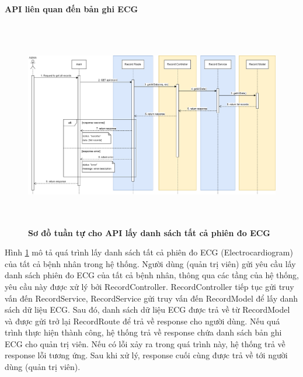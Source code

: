 
\paragraph{API liên quan đến bản ghi ECG}
\mbox{}

\begin{figure}[H]
  \centering
  \includegraphics[width=16cm,height=9cm]{Images/sequence_api/getAllRecord.png}
  \caption[Sơ đồ tuần tự cho API lấy danh sách tất cả phiên đo ECG ]{\bfseries \fontsize{12pt}{0pt}
  \selectfont Sơ đồ tuần tự cho API lấy danh sách tất cả phiên đo ECG }
  \label{getAllEcgRecords} %
\end{figure}
Hình \ref{getAllEcgRecords} mô tả quá trình lấy danh sách tất cả phiên đo ECG (Electrocardiogram) của tất cả bệnh nhân trong hệ thống. Người dùng (quản trị viên) gửi yêu cầu lấy danh sách phiên đo ECG của tất cả bệnh nhân, thông qua các tầng của hệ thống, 
yêu cầu này được xử lý bởi RecordController. RecordController tiếp tục gửi truy vấn đến RecordService, RecordService gửi truy vấn đến RecordModel để lấy danh sách dữ liệu ECG. Sau đó, danh sách dữ liệu ECG được trả về từ RecordModel và được gửi trở lại RecordRoute
 để trả về response cho người dùng. Nếu quá trình thực hiện thành công, hệ thống trả về response chứa danh sách bản ghi ECG cho quản trị viên. Nếu có lỗi xảy ra trong quá trình này, hệ thống trả về response lỗi tương ứng. Sau khi xử lý, response cuối cùng được trả về tới người dùng (quản trị viên).

